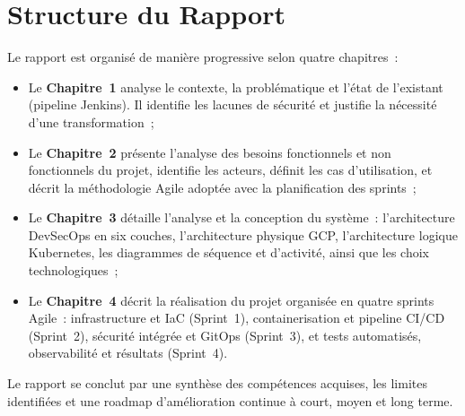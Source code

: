 \section*{Structure du Rapport}

Le rapport est organisé de manière progressive selon quatre chapitres~:

\begin{itemize}
  \item Le \textbf{Chapitre~1} analyse le contexte, la problématique
        et l'état de l'existant (pipeline Jenkins). Il identifie les lacunes de sécurité
        et justifie la nécessité d'une transformation~;
  \item Le \textbf{Chapitre~2} présente l'analyse des besoins fonctionnels
        et non fonctionnels du projet, identifie les acteurs, définit les cas d'utilisation,
        et décrit la méthodologie Agile adoptée avec la planification des sprints~;
  \item Le \textbf{Chapitre~3} détaille l'analyse et la conception du
        système~: l'architecture DevSecOps en six couches, l'architecture physique GCP,
        l'architecture logique Kubernetes, les diagrammes de séquence et d'activité,
        ainsi que les choix technologiques~;
  \item Le \textbf{Chapitre~4} décrit la réalisation du projet
        organisée en quatre sprints Agile~: infrastructure et IaC (Sprint~1), containerisation
        et pipeline CI/CD (Sprint~2), sécurité intégrée et GitOps (Sprint~3), et tests
        automatisés, observabilité et résultats (Sprint~4).
\end{itemize}

Le rapport se conclut par une synthèse des compétences acquises, les limites identifiées
et une roadmap d'amélioration continue à court, moyen et long terme.
